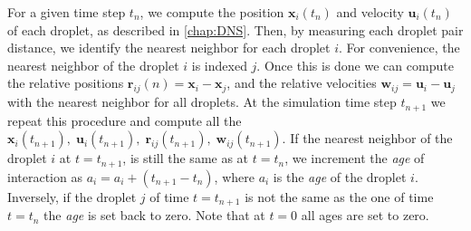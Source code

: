 For a given time step $t_n$, we compute the position $\textbf{x}_i(t_n)$ and velocity $\textbf{u}_i(t_n)$ of each droplet, as described in \ref{chap:DNS}. 
Then, by measuring each droplet pair distance, we identify the nearest neighbor for each droplet $i$. 
For convenience, the nearest neighbor of the droplet $i$ is indexed $j$. 
Once this is done we can compute the relative positions $\textbf{r}_{ij}(n) =\textbf{x}_i - \textbf{x}_j$, and the relative velocities $\textbf{w}_{ij} = \textbf{u}_i - \textbf{u}_j$ with the nearest neighbor for all droplets. 
At the simulation time step $t_{n+1}$ we repeat this procedure and compute all the $\textbf{x}_i(t_{n+1}),\;\textbf{u}_i(t_{n+1}),\;\textbf{r}_{ij}(t_{n+1}),\;\textbf{w}_{ij}(t_{n+1})$. 
If the nearest neighbor of the droplet $i$ at $t = t_{n+1}$, is still the same as at $t = t_n$, we increment the \textit{age} of interaction as $a_i = a_i + (t_{n+1} - t_n)$, where $a_i$ is the \textit{age} of the droplet $i$. 
Inversely, if the droplet $j$ of time $t= t_{n+1}$ is not the same as the one of time $t=t_n$ the \textit{age} is set back to zero. 
Note that at $t = 0$ all ages are set to zero. 


